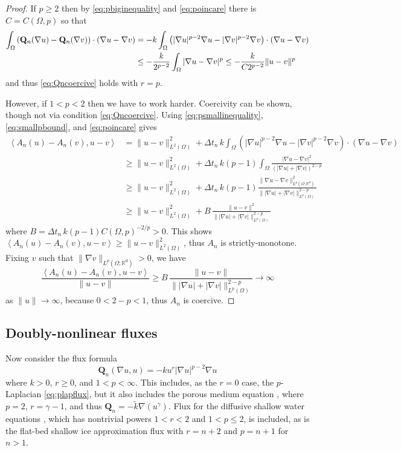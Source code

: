 \documentclass[final,onefignum]{siamart190516}
\newcommand\bQ{\mathbf{Q}}
\newcommand{\grad}{\nabla}
\newcommand{\ip}[2]{\ensuremath{\left<#1,#2\right>}}
\newcommand\RR{\mathbb{R}}
\begin{document}
\begin{proof} If $p\ge 2$ then by \eqref{eq:pbiginequality} and \eqref{eq:poincare} there is $C=C(\Omega,p)$ so that
\begin{align}
\int_\Omega \left(\bQ_n(\grad u) - \bQ_n(\grad v)\right)\cdot (\grad u - \grad v) &= -k  \int_\Omega \left(|\grad u|^{p-2} \grad u - |\grad v|^{p-2} \grad v\right)\cdot (\grad u - \grad v) \notag \\
  &\le - \frac{k}{2^{p-2}} \int_\Omega |\grad u - \grad v|^p \le - \frac{k}{C 2^{p-2}} \|u-v\|^p \label{eq:plapQnmono}
\end{align}
and thus \eqref{eq:Qncoercive} holds with $r=p$.

However, if  $1<p<2$ then we have to work harder.  Coercivity can be shown, though not via condition \eqref{eq:Qncoercive}.  Using \eqref{eq:psmallinequality}, \eqref{eq:smallpbound}, and \eqref{eq:poincare} gives
\begin{align*}
\ip{A_n(u) - A_n(v)}{u-v} &= \|u-v\|_{L^2(\Omega)}^2 + \Delta t_n\,k \int_\Omega \left(|\grad u|^{p-2} \grad u - |\grad v|^{p-2} \grad v\right)\cdot (\grad u - \grad v) \\
  &\ge \|u-v\|_{L^2(\Omega)}^2 + \Delta t_n\,k (p-1) \int_\Omega \frac{|\grad u - \grad v|^2}{\left(|\grad u|+|\grad v|\right)^{2-p}} \\
  &\ge \|u-v\|_{L^2(\Omega)}^2 + \Delta t_n\,k (p-1) \frac{\|\grad u - \grad v\|_{L^p(\Omega; \RR^d)}^2}{\big\||\grad u|+|\grad v|\big\|_{L^p(\Omega)}^{2-p}} \\
  &\ge \|u-v\|_{L^2(\Omega)}^2 + B\, \frac{\|u - v\|^2}{\big\||\grad u|+|\grad v|\big\|_{L^p(\Omega)}^{2-p}}
\end{align*}
where $B = \Delta t_n\,k (p-1) C(\Omega,p)^{-2/p} >0$.  This shows $\ip{A_n(u) - A_n(v)}{u-v} \ge \|u-v\|_{L^2(\Omega)}^2$, thus $A_n$ is strictly-monotone.  Fixing $v$ such that $\|\grad v\|_{L^p(\Omega;\RR^d)} >0$, we have
\begin{equation*}
\frac{\ip{A_n(u) - A_n(v)}{u-v}}{\|u-v\|} \ge B\, \frac{\|u - v\|}{\big\||\grad u|+|\grad v|\big\|_{L^p(\Omega)}^{2-p}} \to \infty
\end{equation*}
as $\|u\|\to\infty$, because $0<2-p<1$, thus $A_n$ is coercive. \end{proof}


\subsection{Doubly-nonlinear fluxes} \label{subsec:powertransform}  Now consider the flux formula
\begin{equation}
  \bQ_n(\grad u,u) = - k u^r |\grad u|^{p-2} \grad u \label{eq:doubleflux}
\end{equation}
where $k>0$, $r\ge 0$, and $1<p<\infty$.  This includes, as the $r=0$ case, the $p$-Laplacian \eqref{eq:plapflux}, but it also includes the porous medium equation \cite{Vazquez2007}, where $p=2$, $r=\gamma-1$, and thus $\bQ_n = - \tilde k \grad(u^\gamma)$.  Flux for the diffusive shallow water equations \cite{AlonsoSantillanaDawson2008}, which has nontrivial powers $1<r<2$ and $1<p\le 2$, is included, as is the flat-bed shallow ice approximation \cite{Calvoetal2002} flux with $r=n+2$ and $p=n+1$ for $n>1$.
\end{document}
